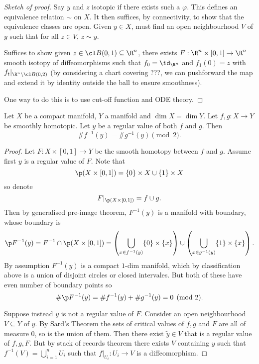 \documentclass[a4paper]{article}
\begin{document}
\begin{proof}[Sketch of proof]
  Say \(y\) and \(z\) isotopic if there exists such a \(\varphi\). This defines an equivalence relation \(\sim\) on \(X\). It then suffices, by connectivity, to show that the equivalence classes are open. Given \(y \in X\), must find an open neighbourhood \(V\) of \(y\) such that for all \(z \in V\), \(z \sim y\).

  Suffices to show given \(z \in \cl B(0, 1) \subseteq \R^n\), there exists \(F: \R^n \times [0, 1] \to \R^n\) smooth isotopy of diffeomorphisms such that  \(f_0 = \id_{\R^n}\) and \(f_1(0) = z\) with \(f_t|_{\R^n\setminus \cl B(0, 2)}\) (by considering a chart covering ???, we can pushforward the map and extend it by identity outside the ball to ensure smoothness).

  One way to do this is to use cut-off function and ODE theory.
\end{proof}

\begin{lemma}
  Let \(X\) be a compact manifold, \(Y\) a manifold and \(\dim X = \dim Y\). Let \(f, g: X \to Y\) be smoothly homotopic. Let \(y\) be a regular value of both \(f\) and \(g\). Then
  \[
    \# f^{-1}(y) = \# g^{-1}(y) \pmod 2.
  \]
\end{lemma}

\begin{proof}
  Let \(F: X \times [0, 1] \to Y\) be the smooth homotopy between \(f\) and \(g\). Assume first \(y\) is a regular value of \(F\). Note that
  \[
    \p(X \times [0, 1]) = \{0\} \times X \cup \{1\} \times X
  \]
  so denote
  \[
    F|_{\p(X \times [0, 1])} = f \cup g.
  \]
  Then by generalised pre-image theorem, \(F^{-1}(y)\) is a manifold with boundary, whose boundary is
  \[
    \p F^{-1}(y) = F^{-1} \cap \p(X \times [0, 1]) = \left( \bigcup_{x \in f^{-1}(y)}\{0\} \times \{x\}\right) \cup \left( \bigcup_{x \in g^{-1}(y)}\{1\} \times \{x\}\right).
  \]
  By assumption \(F^{-1}(y)\) is a compact \(1\)-dim manifold, which by classification above is a union of disjoint circles or closed intervales. But both of these have even number of boundary points so
  \[
    \# \p F^{-1}(y) = \# f^{-1}(y) + \# g^{-1}(y) = 0 \pmod 2.
  \]

  Suppose instead \(y\) is not a regular value of \(F\). Consider an open neighbourhood \(V \subseteq Y\) of \(y\). By Sard's Theorem the sets of critical values of \(f, g\) and \(F\) are all of measure \(0\), so is the union of them. Then there exist \(\tilde y \in V\) that is a regular value of \(f, g, F\). But by stack of records theorem there exists \(V\) containing \(y\) such that \(f^{-1}(V) = \bigcup_{i = 1}^n U_i\) such that \(f|_{U_i}: U_i \to V\) is a diffeomorphism. 
\end{proof}
\end{document}
